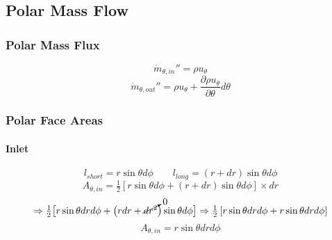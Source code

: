 \documentclass[12pt, letterpaper, twoside]{article}
\begin{document}
    \subsection{Polar Mass Flow}
        \subsubsection{Polar Mass Flux}
            \begin{equation}
                \dot{m}_{\theta,in}'' = \rho u_{\theta}
            \end{equation}
            \begin{equation}
                \dot{m}_{\theta,out}'' = \rho u_{\theta}  +
                \frac{\partial \rho u_{\theta}}{\partial \theta} d\theta
            \end{equation}

        \subsubsection{Polar Face Areas}
        \paragraph{Inlet}
            \begin{equation*}
                l_{short} = r\sin\theta d\phi \qquad
                l_{long} = (r + dr)\sin\theta d\phi 
            \end{equation*}
            \begin{equation}\label{eq:Athetain_init}
                A_{\theta,in} = \tfrac{1}{2} \left[r\sin\theta d\phi +  (r + dr)\sin\theta d\phi\right] \times dr
            \end{equation}
            \begin{equation*}
                \Rightarrow
                \tfrac{1}{2} \big[r\sin\theta dr d\phi +  \big(rdr + \cancelto{0}{dr^2}\big)\sin\theta d\phi\big] 
                \Rightarrow
                \tfrac{1}{2} \left[r\sin\theta dr d\phi + r\sin\theta dr d\phi\right]
            \end{equation*}
            \begin{equation}\label{eq:Athetain_final}
                A_{\theta,in} = r\sin\theta dr d\phi
            \end{equation}
\end{document}
